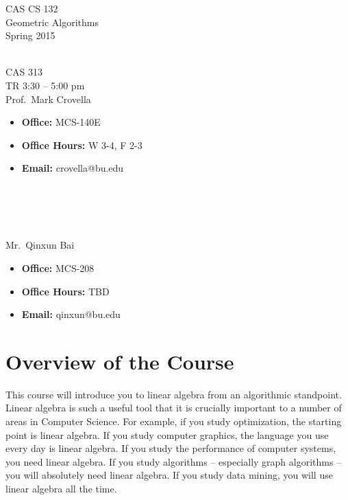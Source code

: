 \documentclass[11pt]{article}
\begin{document}
\sloppy 
\begin{center}
\LARGE CAS CS 132\\
\Large Geometric Algorithms\\
\Large\rm Spring 2015\\~\\
\end{center}

 CAS 313\\[\baselineskip]
 TR 3:30 -- 5:00 pm 
\\[\baselineskip] 

 Prof.\ Mark Crovella\\[0.75\baselineskip]
\begin{minipage}[t]{0.60\textwidth}
\begin{itemize}
\item {\bf Office:} MCS-140E
\item {\bf Office Hours:} {\small W 3-4,  F 2-3}
\item {\bf Email:} crovella@bu.edu
\end{itemize}
\end{minipage}
~\\~\\~\\~\\
  Mr.\ Qinxun Bai\\[0.75\baselineskip]
 \begin{minipage}[t]{0.60\textwidth}
 \begin{itemize}
 \item {\bf Office:} MCS-208
 \item {\bf Office Hours:} {\small TBD}
 \item {\bf Email:} qinxun@bu.edu
 \end{itemize}
 \end{minipage}

\section*{Overview of the Course}

This course will introduce you to linear algebra from an algorithmic
standpoint.  Linear algebra is such a useful tool that it is crucially
important to a number of areas in Computer Science. For example, if you study
optimization, the starting point is linear algebra. If you study
computer graphics, the language you use every day is linear algebra. If
you study the performance of computer systems, you need linear
algebra. If you study algorithms -- especially graph algorithms -- you
will absolutely need linear algebra. If you study data mining, you will
use linear algebra all the time. 
\end{document}
